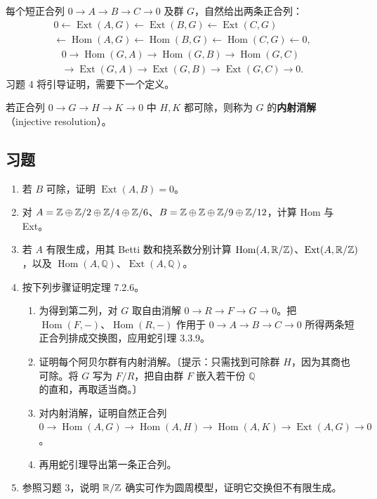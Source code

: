 每个短正合列 $0\to A\to B\to C\to0$ 及群 $G$，自然给出两条正合列：
\[
\begin{split}
0\leftarrow\operatorname{Ext}(A,G)\leftarrow\operatorname{Ext}(B,G)\leftarrow\operatorname{Ext}(C,G)\\
\leftarrow\operatorname{Hom}(A,G)\leftarrow\operatorname{Hom}(B,G)\leftarrow\operatorname{Hom}(C,G)\leftarrow0,
\end{split}
\]
\[
\begin{split}
0\to\operatorname{Hom}(G,A)\to\operatorname{Hom}(G,B)\to\operatorname{Hom}(G,C)\\
\to\operatorname{Ext}(G,A)\to\operatorname{Ext}(G,B)\to\operatorname{Ext}(G,C)\to0.
\end{split}
\]
习题 4 将引导证明，需要下一个定义。

若正合列 $0\to G\to H\to K\to0$ 中 $H,K$ 都可除，则称为 $G$ 的\textbf{内射消解}（injective resolution）。

\subsection*{习题}
\begin{enumerate}
\item 若 $B$ 可除，证明 $\operatorname{Ext}(A,B)=0$。
\item 对 $A=\mathbb{Z}\oplus\mathbb{Z}/2\oplus\mathbb{Z}/4\oplus\mathbb{Z}/6$、$B=\mathbb{Z}\oplus\mathbb{Z}\oplus\mathbb{Z}/9\oplus\mathbb{Z}/12$，计算 Hom 与 Ext。
\item 若 $A$ 有限生成，用其 Betti 数和挠系数分别计算 $\operatorname{Hom}(A,\mathbb{R}/\mathbb{Z})$、$\operatorname{Ext}(A,\mathbb{R}/\mathbb{Z})$，以及 $\operatorname{Hom}(A,\mathbb Q)$、$\operatorname{Ext}(A,\mathbb Q)$。
\item 按下列步骤证明定理 7.2.6。
\begin{enumerate}[label=(\alph*)]
\item 为得到第二列，对 $G$ 取自由消解 $0\to R\to F\to G\to0$。把 $\operatorname{Hom}(F,-)$、$\operatorname{Hom}(R,-)$ 作用于 $0\to A\to B\to C\to0$ 所得两条短正合列排成交换图，应用蛇引理 3.3.9。
\item 证明每个阿贝尔群有内射消解。〔提示：只需找到可除群 $H$，因为其商也可除。将 $G$ 写为 $F/R$，把自由群 $F$ 嵌入若干份 $\mathbb Q$ 的直和，再取适当商。〕
\item 对内射消解，证明自然正合列 $0\to\operatorname{Hom}(A,G)\to\operatorname{Hom}(A,H)\to\operatorname{Hom}(A,K)\to\operatorname{Ext}(A,G)\to0$。
\item 再用蛇引理导出第一条正合列。
\end{enumerate}
\item 参照习题 3，说明 $\mathbb{R}/\mathbb{Z}$ 确实可作为圆周模型，证明它交换但不有限生成。
\end{enumerate}
